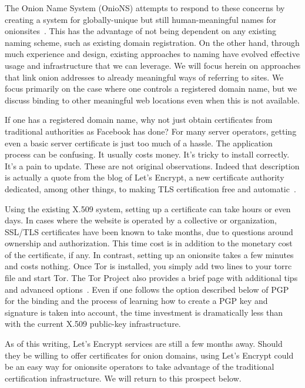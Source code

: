 \documentclass[10pt, conference, compsocconf]{styles/IEEEtran}
\begin{document}
The Onion Name System (OnioNS) attempts to respond to these concerns
by creating a system for globally-unique but still human-meaningful
names for onionsites~\cite{vickers-onions}.  This has the advantage of
not being dependent on any existing naming scheme, such as existing
domain registration. On the other hand, through much experience and
design, existing approaches to naming have evolved effective usage and
infrastructure that we can leverage. We will focus herein on
approaches that link onion addresses to already meaningful ways of
referring to sites. We focus primarily on the case where one controls
a registered domain name, but we discuss binding to other meaningful
web locations even when this is not available.

If one has a registered domain name,
why not just obtain certificates from traditional authorities as
Facebook has done? For many server operators, getting
even a basic server certificate is just too much of a hassle. The
application process can be confusing. It usually costs money. It's
tricky to install correctly. It's a pain to update. 
These are not original observations. Indeed that description is
actually a quote from the blog of Let's Encrypt, a new certificate
authority dedicated, among other things, to making TLS certification
free and automatic~\cite{lets-encrypt}.

Using the existing X.509 system, setting up a certificate can take
hours or even days. In cases where the website is operated by a
collective or organization, SSL/TLS certificates have been known to
take months, due to questions around ownership and authorization.
This time cost is in addition to the monetary cost of the certificate, if any.
In contrast, setting up an onionsite takes a few minutes and costs
nothing. Once Tor is installed, you simply add two lines to your torrc file 
and start Tor. The Tor Project also provides a brief page with
additional tips and advanced options~\cite{hs-config}.  Even if
one follows the option described below of PGP for the binding and the process
of learning how to create a PGP key and signature is taken into
account, the time investment is dramatically less than with the
current X.509 public-key infrastructure.

As of this writing, Let's Encrypt services are still a few months away.
Should they be willing to offer certificates for onion
domains, using Let's Encrypt could be an easy way for
onionsite operators to take advantage of the traditional certification
infrastructure. We will return to this prospect below.
\end{document}

